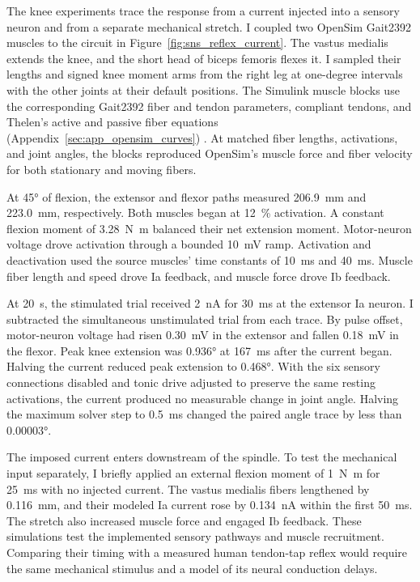 The knee experiments trace the response from a current injected into a sensory neuron and from a separate mechanical stretch. I coupled two OpenSim Gait2392 muscles to the circuit in Figure~\ref{fig:sns_reflex_current}. The vastus medialis extends the knee, and the short head of biceps femoris flexes it. I sampled their lengths and signed knee moment arms from the right leg at one-degree intervals with the other joints at their default positions. The Simulink muscle blocks use the corresponding Gait2392 fiber and tendon parameters, compliant tendons, and Thelen's active and passive fiber equations (Appendix~\ref{sec:app_opensim_curves}) \citep{thelen_adjustment_2003,delp_opensim_2007}. At matched fiber lengths, activations, and joint angles, the blocks reproduced OpenSim's muscle force and fiber velocity for both stationary and moving fibers.

At \ang{45} of flexion, the extensor and flexor paths measured \qty{206.9}{\milli\meter} and \qty{223.0}{\milli\meter}, respectively. Both muscles began at \qty{12}{\percent} activation. A constant flexion moment of \qty{3.28}{\newton\meter} balanced their net extension moment. Motor-neuron voltage drove activation through a bounded \qty{10}{\milli\volt} ramp. Activation and deactivation used the source muscles' time constants of \qty{10}{\milli\second} and \qty{40}{\milli\second}. Muscle fiber length and speed drove Ia feedback, and muscle force drove Ib feedback.

At \qty{20}{\second}, the stimulated trial received \qty{2}{\nano\ampere} for \qty{30}{\milli\second} at the extensor Ia neuron. I subtracted the simultaneous unstimulated trial from each trace. By pulse offset, motor-neuron voltage had risen \qty{0.30}{\milli\volt} in the extensor and fallen \qty{0.18}{\milli\volt} in the flexor. Peak knee extension was \ang{0.936} at \qty{167}{\milli\second} after the current began. Halving the current reduced peak extension to \ang{0.468}. With the six sensory connections disabled and tonic drive adjusted to preserve the same resting activations, the current produced no measurable change in joint angle. Halving the maximum solver step to \qty{0.5}{\milli\second} changed the paired angle trace by less than \ang{0.00003}.

The imposed current enters downstream of the spindle. To test the mechanical input separately, I briefly applied an external flexion moment of \qty{1}{\newton\meter} for \qty{25}{\milli\second} with no injected current. The vastus medialis fibers lengthened by \qty{0.116}{\milli\meter}, and their modeled Ia current rose by \qty{0.134}{\nano\ampere} within the first \qty{50}{\milli\second}. The stretch also increased muscle force and engaged Ib feedback. These simulations test the implemented sensory pathways and muscle recruitment. Comparing their timing with a measured human tendon-tap reflex would require the same mechanical stimulus and a model of its neural conduction delays.


